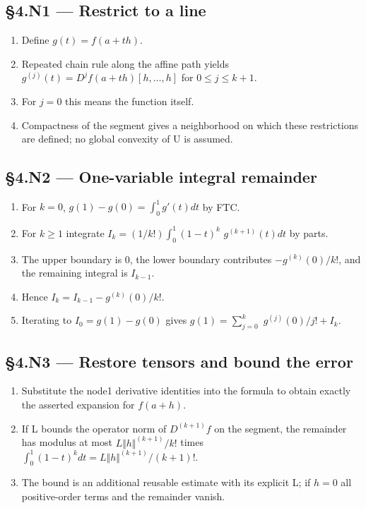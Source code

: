 \documentclass[preprint,12pt,aps,pra,showkeys,amsmath,amssymb,superscriptaddress,floatfix]{revtex4-2}
\theoremstyle{definition}
\theoremstyle{remark}
\begin{document}
\subsection{§4.N1 --- Restrict to a line}\label{n1-restrict-to-a-line}

\begin{enumerate}
\def\labelenumi{\arabic{enumi}.}
\item
  Define \(g(t)=f(a+th)\).
\item
  Repeated chain rule along the affine path yields
  \(g^{(j)}(t)=D^jf(a+th)[h,\ldots ,h]\) for \(0\le j\le k+1\).
\item
  For \(j=0\) this means the function itself.
\item
  Compactness of the segment gives a neighborhood on which these
  restrictions are defined; no global convexity of U is assumed.
\end{enumerate}

\subsection{§4.N2 --- One-variable integral
remainder}\label{n2-one-variable-integral-remainder}

\begin{enumerate}
\def\labelenumi{\arabic{enumi}.}
\item
  For \(k=0\), \(g(1)-g(0)=\int _{0}^{1}g'(t)dt\) by FTC.
\item
  For \(k\ge 1\) integrate \(I_k=(1/k!)\int _{0}^{1}(1-t)^k\)
  \(g^{(k+1)}(t)dt\) by parts.
\item
  The upper boundary is 0, the lower boundary contributes
  \(-g^{(k)}(0)/k!\), and the remaining integral is \(I_{k-1}\).
\item
  Hence \(I_k=I_{k-1}-g^{(k)}(0)/k!\).
\item
  Iterating to \(I_{0}=g(1)-g(0)\) gives \(g(1)=\sum _{j=0}^k\)
  \(g^{(j)}(0)/j!+I_k\).
\end{enumerate}

\subsection{§4.N3 --- Restore tensors and bound the
error}\label{n3-restore-tensors-and-bound-the-error}

\begin{enumerate}
\def\labelenumi{\arabic{enumi}.}
\item
  Substitute the node1 derivative identities into the formula to obtain
  exactly the asserted expansion for \(f(a+h)\).
\item
  If L bounds the operator norm of \(D^{(k+1)}f\) on the segment, the
  remainder has modulus at most \(L\Vert h\Vert ^{(k+1)}/k!\) times
  \(\int _{0}^{1}(1-t)^kdt=L\Vert h\Vert ^{(k+1)}/(k+1)!\).
\item
  The bound is an additional reusable estimate with its explicit L; if
  \(h=0\) all positive-order terms and the remainder vanish.
\end{enumerate}
\end{document}
